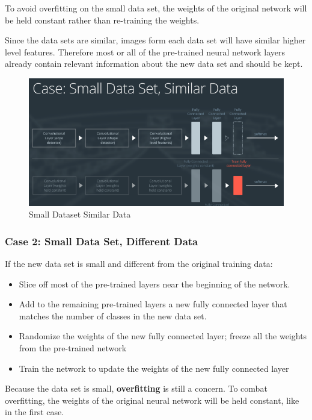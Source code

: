 \documentclass[11pt, a4paper]{article}
\begin{document}
To avoid overfitting on the small data set, the weights of the original network will be held constant rather than re-training the weights.

Since the data sets are similar, images form each data set will have similar higher level features. Therefore most or all of the pre-trained neural network layers already contain relevant information about the new data set and should be kept.


\begin{figure}[htpb!]
	\centering
	\includegraphics[width=0.8\linewidth]{small_dataset_similar_data}
	\caption{Small Dataset Similar Data}
	\label{fig:small_dataset_similar_data}
\end{figure}



\subsubsection{Case 2: Small Data Set, Different Data}%
\label{ssub:case_2_small_data_set_different_data}



If the new data set is small and different from the original training data:


\begin{itemize}
	\item Slice off most of the pre-trained layers near the beginning of the network.
	\item Add to the remaining pre-trained layers a new fully connected layer that matches the number of classes in the new data set.
	\item Randomize the weights of the new fully connected layer; freeze all the weights from the pre-trained network
	\item Train the network to update the weights of the new fully connected layer
\end{itemize}


Because the data set is small, \textbf{overfitting} is still a concern. To combat overfitting, the weights of the original neural network will be held constant, like in the first case. 
\end{document}
